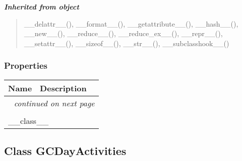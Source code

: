 \large{\textbf{\textit{Inherited from object}}}

\begin{quote}
\_\_delattr\_\_(), \_\_format\_\_(), \_\_getattribute\_\_(), \_\_hash\_\_(), \_\_new\_\_(), \_\_reduce\_\_(), \_\_reduce\_ex\_\_(), \_\_repr\_\_(), \_\_setattr\_\_(), \_\_sizeof\_\_(), \_\_str\_\_(), \_\_subclasshook\_\_()
\end{quote}


  \subsubsection{Properties}

    \vspace{-1cm}
\hspace{\varindent}\begin{longtable}{|p{\varnamewidth}|p{\vardescrwidth}|l}
\cline{1-2}
\cline{1-2} \centering \textbf{Name} & \centering \textbf{Description}& \\
\cline{1-2}
\endhead\cline{1-2}\multicolumn{3}{r}{\small\textit{continued on next page}}\\\endfoot\cline{1-2}
\endlastfoot\multicolumn{2}{|l|}{\textit{Inherited from object}}\\
\multicolumn{2}{|p{\varwidth}|}{\raggedright \_\_class\_\_}\\
\cline{1-2}
\end{longtable}



\subsection{Class GCDayActivities}

